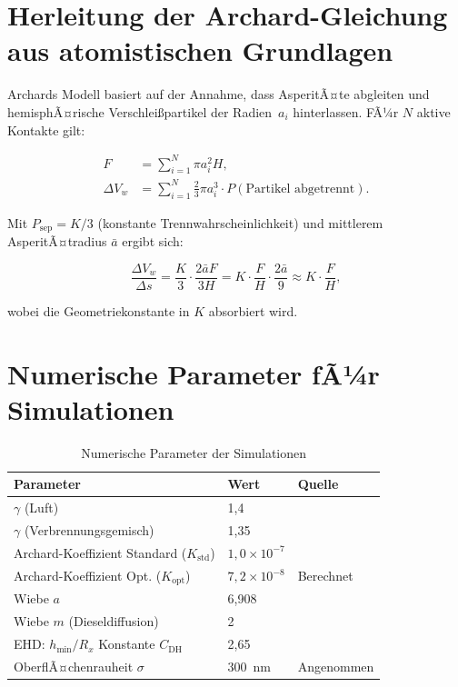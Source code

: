 ﻿\documentclass[12pt,a4paper]{article}
\begin{document}
\appendix
\section{Herleitung der Archard-Gleichung aus atomistischen Grundlagen}
\label{app:archard_herleitung}

Archards Modell basiert auf der Annahme, dass AsperitÃ¤te abgleiten und
hemisphÃ¤rische Verschlei\ss{}partikel der Radien~$a_i$ hinterlassen. FÃ¼r
$N$ aktive Kontakte gilt:

\begin{align}
  F &= \sum_{i=1}^{N} \pi a_i^2 H, \\
  \Delta V_w &= \sum_{i=1}^{N} \frac{2}{3}\pi a_i^3 \cdot P(\text{Partikel abgetrennt}).
\end{align}

Mit $P_{\mathrm{sep}} = K/3$ (konstante Trennwahrscheinlichkeit) und mittlerem
AsperitÃ¤tradius $\bar{a}$ ergibt sich:

\begin{equation}
  \frac{\Delta V_w}{\Delta s} = \frac{K}{3} \cdot \frac{2 \bar{a} F}{3H}
  = K \cdot \frac{F}{H} \cdot \frac{2\bar{a}}{9} \approx K \cdot \frac{F}{H},
\end{equation}

wobei die Geometriekonstante in $K$ absorbiert wird.

\section{Numerische Parameter fÃ¼r Simulationen}
\label{app:parameter}

\begin{table}[H]
  \centering
  \caption{Numerische Parameter der Simulationen}
  \label{tab:parameter}
  \begin{tabular}{lll}
    \toprule
    Parameter & Wert & Quelle \\
    \midrule
    $\gamma$ (Luft) & 1{,}4 & \cite{cengel2014} \\
    $\gamma$ (Verbrennungsgemisch) & 1{,}35 & \cite{heywood1988} \\
    Archard-Koeffizient Standard ($K_{\mathrm{std}}$) & $1{,}0 \times 10^{-7}$ & \cite{rabinowicz1995} \\
    Archard-Koeffizient Opt. ($K_{\mathrm{opt}}$) & $7{,}2 \times 10^{-8}$ & Berechnet \\
    Wiebe $a$ & 6{,}908 & \cite{wiebe1970} \\
    Wiebe $m$ (Dieseldiffusion) & 2 & \cite{merker2014} \\
    EHD: $h_{\min}/R_x$ Konstante $C_{\mathrm{DH}}$ & 2{,}65 & \cite{dowson1977} \\
    OberflÃ¤chenrauheit $\sigma$ & \SI{300}{\nm} & Angenommen \\
    \bottomrule
  \end{tabular}
\end{table}
\end{document}
